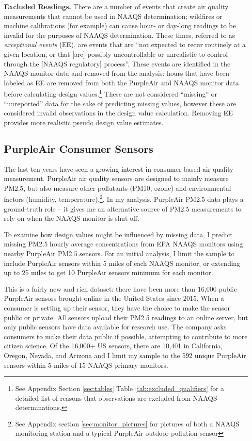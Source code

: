 \documentclass[12pt]{article}
\begin{document}
\textbf{Excluded Readings.} There are a number of events that create air quality measurements that cannot be used in NAAQS determination; wildfires or machine calibrations (for example) can cause hour- or day-long readings to be invalid for the purposes of NAAQS determination. These times, referred to as \textit{exceptional events} (EE), are events that are ``not expected to recur routinely at a given location, or that [are] possibly uncontrollable or unrealistic to control through the [NAAQS regulatory] process''\citep{epaEventQualifier1990}. These events are identified in the NAAQS monitor data and removed from the analysis: hours that have been labeled as EE are removed from both the PurpleAir and NAAQS monitor data before calculating design values.\footnote{See Appendix Section \ref{sec:tables} Table \ref{tab:excluded_qualifiers} for a detailed list of reasons that observations are excluded from NAAQS determinations.} These are not considered ``missing'' or ``unreported'' data for the sake of predicting missing values, however these are considered invalid observations in the design value calculation. Removing EE provides more realistic pseudo design value estimates.

\subsection{PurpleAir Consumer Sensors}
The last ten years have seen a growing interest in consumer-based air quality measurement. PurpleAir air quality sensors are designed to mainly measure PM2.5, but also measure other pollutants (PM10, ozone) and environmental factors (humidity, temperature).\footnote{See Appendix section \ref{sec:monitor_pictures} for pictures of both a NAAQS monitoring station and a typical PurpleAir outdoor pollution sensor}. In my analysis, PurpleAir PM2.5 data plays a ground-truth role -- it gives me an alternative source of PM2.5 measurements to rely on when the NAAQS monitor is shut off. 

To examine how design values might be influenced by missing data, I predict missing PM2.5 hourly average concentrations from EPA NAAQS monitors using nearby PurpleAir PM2.5 sensors. For an initial analysis, I limit the sample to include PurpleAir sensors within 5 miles of each NAAQS monitor, or extending up to 25 miles to get 10 PurpleAir sensors minimum for each monitor.

This is a fairly new and rich dataset: there have been more than 16,000 public PurpleAir sensors brought online in the United States since 2015. When a consumer is setting up their sensor, they have the choice to make the sensor public or private. All sensors upload their PM2.5 readings to an online server, but only public sensors have data available for research use. The company asks consumers to make their data public if possible, attempting to contribute to more citizen science. Of the 16,000+ US sensors, there are 10,401 in California, Oregon, Nevada, and Arizona and I limit my sample to the 592 unique PurpleAir sensors within 5 miles of 15 NAAQS-primary monitors.
\end{document}
